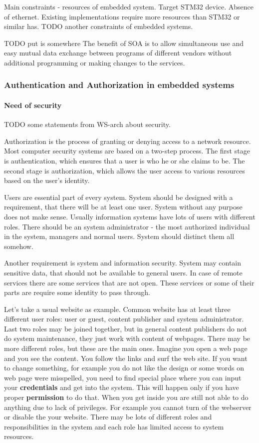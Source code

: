 Main constraints - resources of embedded system.
Target STM32 device.
Absence of ethernet.
Existing implementations require more resources than STM32 or similar has.
TODO another constraints of embedded systems.

TODO put is somewhere
 The benefit of SOA is
to allow simultaneous use and easy mutual data exchange between programs of different vendors without additional programming or making changes to the services.
 

\subsubsection{Authentication and Authorization in embedded systems}
\paragraph{Need of security}
TODO some statements from WS-arch about security.


Authorization is the process of granting or denying access to a network resource.
Most computer security systems are based on a two-step process.
The first stage is authentication, which ensures that a user is who he or she claims to be.
The second stage is authorization, which allows the user access to various resources based on the user's identity. 

Users are essential part of every system. System should be designed with
a requirement, that there will be at least one user. System without any purpose
does not make sense. Usually information systems have lots of users with
different roles. There should be an system administrator - the most authorized individual
in the system, managers and normal users. System should distinct them all
somehow. 

Another requirement is system and information security. System may contain
sensitive data, that should not be available to general users. In case of remote
services there are some services that are not open. These services or some
of their parts are require some identity to pass through. 

Let's take a usual website as example. Common website has at least three
different user roles:
user or guest, content publisher and system administrator. Last two roles may be
joined together, but in general content publishers do not do system maintenance, they
just work with content of webpages. There may be more different roles, but these
are the main ones. Imagine you open a web page and you see the content. You
follow the links and surf the web site. If you want to change something, for
example you do not like the design or some words on web page were misspelled,
you need to find special place where you can input your \textbf{credentials} and
get into the system. This will happen only if you have proper
\textbf{permission} to do that. When you get inside you are still not able to do
anything due to lack of privileges. For example you cannot turn of the
webserver or disable the your website. There may be lots of different roles and
responsibilities in the system and each role has limited access to system
resources.

